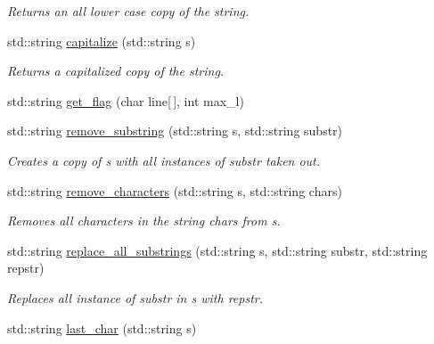 \begin{DoxyCompactItemize}
\begin{DoxyCompactList}\small\item\em Returns an all lower case copy of the string. \end{DoxyCompactList}\item 
\hypertarget{namespacepyne_a8855d064ba8f0c3ab7b85aa9788c9673}{std\-::string \hyperlink{namespacepyne_a8855d064ba8f0c3ab7b85aa9788c9673}{capitalize} (std\-::string s)}\label{namespacepyne_a8855d064ba8f0c3ab7b85aa9788c9673}

\begin{DoxyCompactList}\small\item\em Returns a capitalized copy of the string. \end{DoxyCompactList}\item 
std\-::string \hyperlink{namespacepyne_ab883f7c602f63e87fae5c2f48cfed0f8}{get\-\_\-flag} (char line\mbox{[}$\,$\mbox{]}, int max\-\_\-l)
\item 
\hypertarget{namespacepyne_adf03d1957dc2420ef99554c6fe4c4ec0}{std\-::string \hyperlink{namespacepyne_adf03d1957dc2420ef99554c6fe4c4ec0}{remove\-\_\-substring} (std\-::string s, std\-::string substr)}\label{namespacepyne_adf03d1957dc2420ef99554c6fe4c4ec0}

\begin{DoxyCompactList}\small\item\em Creates a copy of {\itshape s} with all instances of {\itshape substr} taken out. \end{DoxyCompactList}\item 
\hypertarget{namespacepyne_ae6154cc77d52eaeb50b1e35f043c1070}{std\-::string \hyperlink{namespacepyne_ae6154cc77d52eaeb50b1e35f043c1070}{remove\-\_\-characters} (std\-::string s, std\-::string chars)}\label{namespacepyne_ae6154cc77d52eaeb50b1e35f043c1070}

\begin{DoxyCompactList}\small\item\em Removes all characters in the string {\itshape chars} from {\itshape s}. \end{DoxyCompactList}\item 
\hypertarget{namespacepyne_a181f9781cb5da2ca18b1946792996268}{std\-::string \hyperlink{namespacepyne_a181f9781cb5da2ca18b1946792996268}{replace\-\_\-all\-\_\-substrings} (std\-::string s, std\-::string substr, std\-::string repstr)}\label{namespacepyne_a181f9781cb5da2ca18b1946792996268}

\begin{DoxyCompactList}\small\item\em Replaces all instance of {\itshape substr} in {\itshape s} with {\itshape repstr}. \end{DoxyCompactList}\item 
\hypertarget{namespacepyne_a97495e780a8fd91e4604e5a7b2f84f3e}{std\-::string \hyperlink{namespacepyne_a97495e780a8fd91e4604e5a7b2f84f3e}{last\-\_\-char} (std\-::string s)}\label{namespacepyne_a97495e780a8fd91e4604e5a7b2f84f3e}


\end{DoxyCompactItemize}
